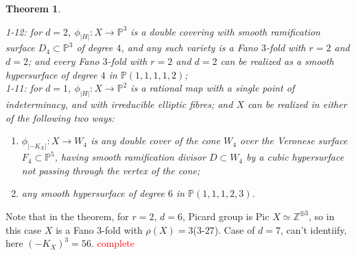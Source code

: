 \documentclass[11pt]{amsart}
\theoremstyle{plain}
\newtheorem{theorem}{Theorem}[section]
\theoremstyle{definition}
\theoremstyle{expl}
\begin{document}
\begin{theorem}
\begin{enumerate}
        1-12: for $d=2$, $\phi_{|H|}: X \to \mathbb{P}^3$ is a double covering with smooth ramification surface $D_4 \subset \mathbb{P}^3$ of degree $4$, and any such variety  is a Fano $3$-fold with $r=2$ and $d=2$; and every Fano $3$-fold with $r=2$ and $d=2$ can be realized as a smooth hypersurface of degree $4$ in $\mathbb{P}(1,1,1,1,2)$;\\
        1-11: for $d=1$, $\phi_{|H|}: X \to \mathbb{P}^2$ is a rational map with a single point of indeterminacy, and with irreducible elliptic fibres; and $X$ can be realized in either of the following two ways:
        \begin{enumerate}
            \item[(a)] $\phi_{|-K_X|}: X \to W_4$ is any double cover of the cone $W_4$ over the Veronese surface $F_4 \subset \mathbb{P}^5$, having smooth ramification divisor $D \subset W_4$ by a cubic hypersurface not passing through the vertex of the cone;
            \item[(b)] any smooth hypersurface of degree $6$ in $\mathbb{P}(1,1,1,2,3)$.
        \end{enumerate}
    \end{enumerate}
\end{theorem}
\noindent Note that in the theorem, for $r=2$, $d=6$, Picard group is Pic $X \simeq \mathbb{Z}^{\oplus 3}$, so in this case $X$ is a Fano $3$-fold with $\rho(X)=3$($3$-$27$). Case of $d=7$, can't identiify, here $(-K_X)^3=56$. \textcolor{red}{complete}
\end{document}
